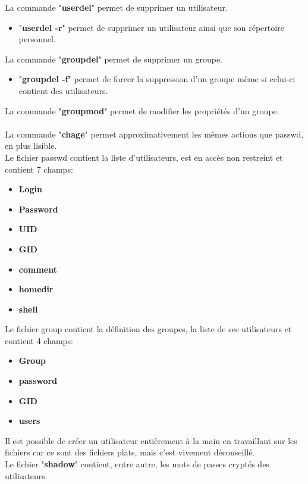 \documentclass[12pt, a4paper]{article}
\begin{document}
La commande "\textbf{userdel}" permet de supprimer un utilisateur.
\begin{itemize}
\setlength\itemsep{-0.5em}
\item "\textbf{userdel -r}" permet de supprimer un utilisateur ainsi que son répertoire personnel.
\end{itemize}
La commande "\textbf{groupdel}" permet de supprimer un groupe.
\begin{itemize}
\setlength\itemsep{-0.5em}
\item "\textbf{groupdel -f}" permet de forcer la suppression d'un groupe même si celui-ci contient des utilisateurs.
\end{itemize}
La commande "\textbf{groupmod}" permet de modifier les propriétés d'un groupe.\\
\\
La commande "\textbf{chage}" permet approximativement les mêmes actions que passwd, en plus lisible.\\
Le fichier passwd contient la liste d'utilisateurs, est en accès non restreint et contient 7 champs:
\begin{itemize}
\setlength\itemsep{-0.4em}
\item \textbf{Login}
\item \textbf{Password}
\item \textbf{UID}
\item \textbf{GID}
\item \textbf{comment}
\item \textbf{homedir}
\item \textbf{shell}\\
\end{itemize}
Le fichier group contient la définition des groupes, la liste de ses utilisateurs et contient 4 champs:
\begin{itemize}
\setlength\itemsep{-0.4em}
\item \textbf{Group}
\item \textbf{password}
\item \textbf{GID}
\item \textbf{users}\\
\end{itemize}
Il est possible de créer un utilisateur entièrement à la main en travaillant sur les fichiers car ce sont des fichiers plats, mais c'est vivement déconseillé.\\
Le fichier "\textbf{shadow}" contient, entre autre, les mots de passes cryptés des utilisateurs.\\
\newpage\vspace*{1cm}
\end{document}
